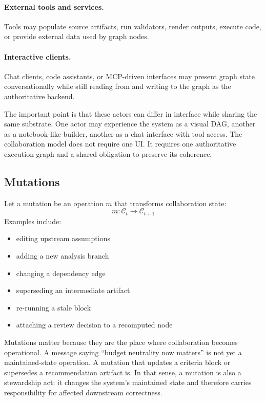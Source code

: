 \documentclass{article}
\begin{document}
\paragraph{External tools and services.}
Tools may populate source artifacts, run validators, render outputs, execute code, or provide external data used by graph nodes.

\paragraph{Interactive clients.}
Chat clients, code assistants, or MCP-driven interfaces may present graph state conversationally while still reading from and writing to the graph as the authoritative backend.

The important point is that these actors can differ in interface while sharing the same substrate. One actor may experience the system as a visual DAG, another as a notebook-like builder, another as a chat interface with tool access. The collaboration model does not require one UI. It requires one authoritative execution graph and a shared obligation to preserve its coherence.

\subsection{Mutations}

Let a mutation be an operation $m$ that transforms collaboration state:
\begin{equation}
m : \mathcal{C}_t \rightarrow \mathcal{C}_{t+1}
\end{equation}
Examples include:
\begin{itemize}
\item editing upstream assumptions
\item adding a new analysis branch
\item changing a dependency edge
\item superseding an intermediate artifact
\item re-running a stale block
\item attaching a review decision to a recomputed node
\end{itemize}

Mutations matter because they are the place where collaboration becomes operational. A message saying ``budget neutrality now matters'' is not yet a maintained-state operation. A mutation that updates a criteria block or supersedes a recommendation artifact is. In that sense, a mutation is also a stewardship act: it changes the system's maintained state and therefore carries responsibility for affected downstream correctness.
\end{document}
